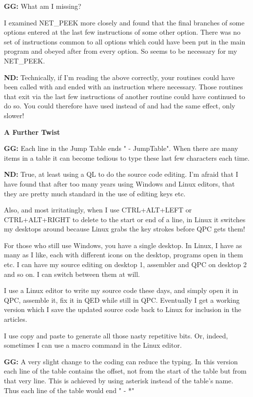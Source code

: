 \textbf{GG: }What am I missing?

I examined NET\_PEEK more closely and found that the final branches of some options entered at the last few instructions of some other option. There was no set of instructions common to all options which could have been put in the main program and obeyed after  from every option. So  seems to be necessary for my NET\_PEEK.

\textbf{ND: }Technically, if I'm reading the above correctly, your routines could have been called with  and ended with an  instruction where necessary. Those routines that exit via the last few instructions of another routine could have continued to do so. You could therefore have used  instead of  and had the same effect, only slower!


\textbf{A Further Twist}

\textbf{GG: }Each line in the Jump Table ends " - JumpTable". When there are many items in a table it can become tedious to type these last few characters each time.

\textbf{ND: }True, at least using a QL to do the source code editing. I'm afraid that I have found that after too many years using Windows and Linux editors, that they are pretty much standard in the use of editing keys etc. 

Also, and most irritatingly, when I use CTRL+ALT+LEFT or CTRL+ALT+RIGHT to delete to the start or end of a line, in Linux it switches my desktops around because Linux grabs the key strokes before QPC gets them! 

For those who still use Windows, you have a single desktop. In Linux, I have as many as I like, each with different icons on the desktop, programs open in them etc. I can have my source editing on desktop 1, assembler and QPC on desktop 2 and so on. I can switch between them at will.

I use a Linux editor to write my source code these days, and simply open it in QPC, assemble it, fix it in QED while still in  QPC. Eventually I get a working version which I save the updated source code back to Linux for inclusion in the articles.

I use copy and paste to generate all those nasty repetitive bits. Or, indeed, sometimes I can use a macro command in the Linux editor.

\textbf{GG: }A very slight change to the coding can reduce the typing. In this version each line of the table contains the offset, not from the start of the table but from that very line. This is achieved by using asterisk instead of the table's name. Thus each line of the table would end " - *"

